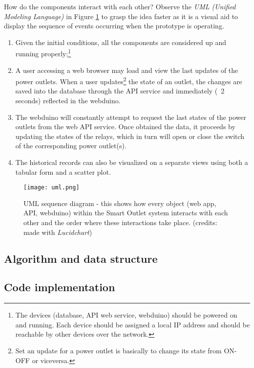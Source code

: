 \noindent
How do the components interact with each other? Observe the \emph{UML (Unified Modeling Language)} in Figure \ref{fig:uml-diagram} to grasp the idea faster as it is a visual aid to display the sequence of events occurring when the prototype is operating.
\begin{enumerate}
    \item Given the initial conditions, all the components are considered up and running properly;\footnote{The devices (database, API web service, webduino) should be powered on and running. Each device should be assigned a local IP address and should be reachable by other devices over the network.}
    \item A user accessing a web browser may load and view the last updates of the power outlets. When a user updates\footnote{Set an update for a power outlet is basically to change its state from ON-OFF or viceversa.} the state of an outlet, the changes are saved into the database through the API service and immediately (~2 seconds) reflected in the webduino.
    \item The webduino will constantly attempt to request the last states of the power outlets from the web API service. Once obtained the data, it proceeds by updating the states of the relays, which in turn will open or close the switch of the corresponding power outlet(s).
    \item The historical records can also be visualized on a separate views using both a tabular form and a scatter plot.
\end{enumerate}

\begin{figure}[ht!]
    \centering
    \texttt{[image: uml.png]}
    \caption{UML sequence diagram - this shows how every object (web app, API, webduino) within the Smart Outlet system interacts with each other and the order where these interactions take place. (credits: made with \emph{Lucidchart})}
    \label{fig:uml-diagram}
\end{figure}

\subsection{Algorithm and data structure}

\subsection{Code implementation}
